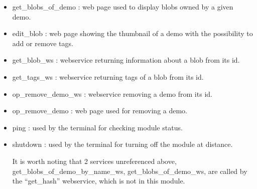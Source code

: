 \begin{itemize}
\item get\_blobs\_of\_demo : web page used to display blobs owned by a given demo.
\item edit\_blob : web page showing the thumbnail of a demo with the possibility to add or remove tags.
\item get\_blob\_ws : webservice returning information about a blob from its id.
\item get\_tags\_ws : webservice returning tags of a blob from its id.
\item op\_remove\_demo\_ws : webservice removing a demo from its id.
\item op\_remove\_demo : web page used for removing a demo.
\item ping : used by the terminal for checking module status.
\item shutdown : used by the terminal for turning off the module at distance.
  
  It is worth noting that 2 services unreferenced above, get\_blobs\_of\_demo\_by\_name\_ws, get\_blobs\_of\_demo\_ws, are called by the ``get\_hash'' webservice, which is not in this module.
  
\end{itemize}
